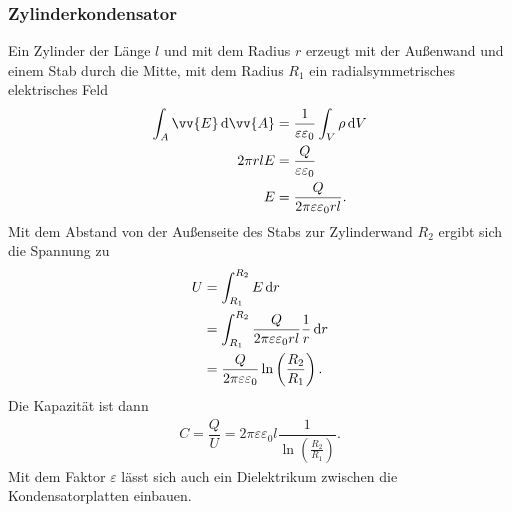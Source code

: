 \subsubsection{Zylinderkondensator}
Ein Zylinder der Länge $l$ und mit dem Radius $r$ erzeugt mit der Außenwand und einem Stab durch die Mitte, mit dem Radius $R_1$ ein radialsymmetrisches elektrisches Feld
\begin{align*}
        \int_{A}^{}\vv{E}\td \vv{A}&=\dfrac{1}{\varepsilon \varepsilon _0}\int_{V}^{}\rho \td V\\
        2\pi rlE&=\dfrac{Q}{\varepsilon \varepsilon _0}\\
        E&=\dfrac{Q}{2\pi \varepsilon \varepsilon _0rl}
.\end{align*}
Mit dem Abstand von der Außenseite des Stabs zur Zylinderwand $R_2$ ergibt sich die Spannung zu
\begin{align*}
        U&=\int_{R_1}^{R_2}E\,\text{d} r\\
         &=\int_{R_1}^{R_2}\dfrac{Q}{2\pi \varepsilon \varepsilon _0rl}\dfrac{1}{r}\,\text{d} r\\
         &=\dfrac{Q}{2\pi \varepsilon \varepsilon _0}\ln \left(\dfrac{R_2}{R_1}\right)
.\end{align*}
Die Kapazität ist dann
\begin{align*}
        C=\dfrac{Q}{U}=2\pi \varepsilon \varepsilon _0l\dfrac{1}{\ln \left(\tfrac{R_2}{R_1}\right)}
.\end{align*}
Mit dem Faktor $\varepsilon $ lässt sich auch ein Dielektrikum zwischen die Kondensatorplatten einbauen.

